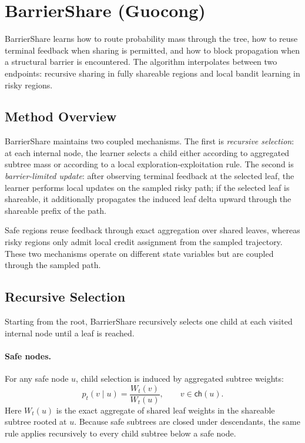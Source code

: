 \section{BarrierShare (Guocong)}
\label{sec:barriershare}

BarrierShare learns how to route probability mass through the tree, how to reuse terminal feedback when sharing is permitted, and how to block propagation when a structural barrier is encountered. The algorithm interpolates between two endpoints: recursive sharing in fully shareable regions and local bandit learning in risky regions.

\subsection{Method Overview}
\label{sec:barriershare_overview}

BarrierShare maintains two coupled mechanisms. The first is \emph{recursive selection}: at each internal node, the learner selects a child either according to aggregated subtree mass or according to a local exploration-exploitation rule. The second is \emph{barrier-limited update}: after observing terminal feedback at the selected leaf, the learner performs local updates on the sampled risky path; if the selected leaf is shareable, it additionally propagates the induced leaf delta upward through the shareable prefix of the path.

Safe regions reuse feedback through exact aggregation over shared leaves, whereas risky regions only admit local credit assignment from the sampled trajectory. These two mechanisms operate on different state variables but are coupled through the sampled path.

\subsection{Recursive Selection}
\label{sec:barriershare_selection}

Starting from the root, BarrierShare recursively selects one child at each visited internal node until a leaf is reached.

\paragraph{Safe nodes.}
For any safe node $u$, child selection is induced by aggregated subtree weights:
\begin{equation}
    p_t(v\mid u) = \frac{W_t(v)}{W_t(u)},
    \qquad v \in \mathsf{ch}(u).
    \label{eq:safe_selection}
\end{equation}
Here $W_t(u)$ is the exact aggregate of shared leaf weights in the shareable subtree rooted at $u$. Because safe subtrees are closed under descendants, the same rule applies recursively to every child subtree below a safe node.

